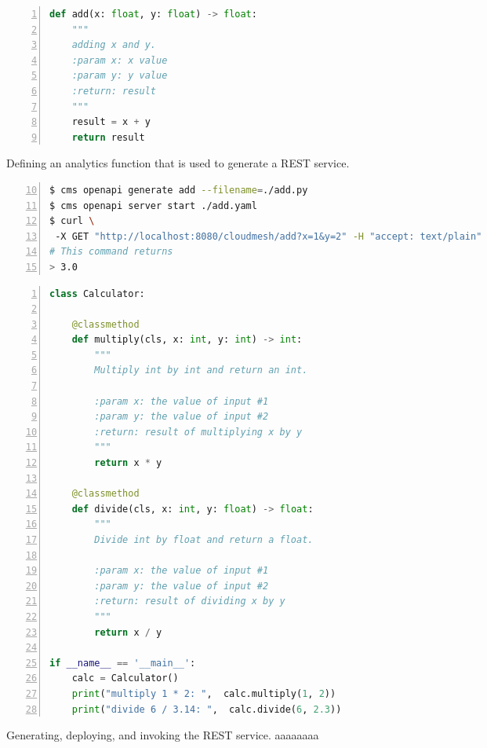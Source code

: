 \begin{figure}[htb]
\begin{lstlisting}[language=Python,
                   basicstyle=\ttfamily\FONT,
                   numbers=left,                   
                   numbersep=5pt,
                   xleftmargin=5mm]
def add(x: float, y: float) -> float:
    """
    adding x and y.
    :param x: x value
    :param y: y value
    :return: result
    """
    result = x + y
    return result
\end{lstlisting}
\caption{Defining an analytics function that is used to generate a REST service.}
\label{fig:function}
\bigskip
\begin{lstlisting}[language=bash,
                   firstnumber=10,
                   basicstyle=\ttfamily\tiny,
                   numbers=left,                   
                   numbersep=5pt,
                   xleftmargin=5mm]
$ cms openapi generate add --filename=./add.py
$ cms openapi server start ./add.yaml 
$ curl \ 
 -X GET "http://localhost:8080/cloudmesh/add?x=1&y=2" -H "accept: text/plain"
# This command returns
> 3.0
\end{lstlisting}
\caption{Generating, deploying, and invoking the REST service. {\color{white}aaaaaaaa}}
\label{fig:deploy-function}
\label{fig:function-curl}
\bigskip
\begin{lstlisting}[language=Python,
                   basicstyle=\ttfamily\FONT,
                   numbers=left,                   
                   numbersep=5pt,
                   xleftmargin=5mm]
class Calculator:

    @classmethod
    def multiply(cls, x: int, y: int) -> int:
        """
        Multiply int by int and return an int.

        :param x: the value of input #1
        :param y: the value of input #2
        :return: result of multiplying x by y
        """
        return x * y

    @classmethod
    def divide(cls, x: int, y: float) -> float:
        """
        Divide int by float and return a float.

        :param x: the value of input #1
        :param y: the value of input #2
        :return: result of dividing x by y
        """
        return x / y

if __name__ == '__main__':
    calc = Calculator()
    print("multiply 1 * 2: ",  calc.multiply(1, 2))
    print("divide 6 / 3.14: ",  calc.divide(6, 2.3))

\end{lstlisting}


\end{figure}

